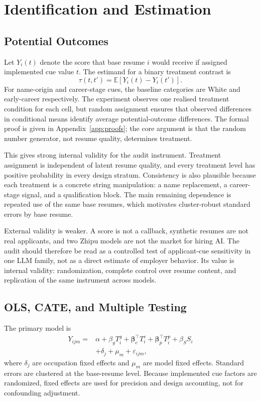 \documentclass[10pt,twocolumn,letterpaper]{article}
\begin{document}
\section{Identification and Estimation}

\subsection{Potential Outcomes}

Let $Y_i(t)$ denote the score that base resume $i$ would receive if assigned implemented cue value $t$. The estimand for a binary treatment contrast is
\[
\tau(t,t') = \mathbb{E}[Y_i(t)-Y_i(t')].
\]
For name-origin and career-stage cues, the baseline categories are White and early-career respectively. The experiment observes one realised treatment condition for each cell, but random assignment ensures that observed differences in conditional means identify average potential-outcome differences. The formal proof is given in Appendix~\ref{app:proofs}; the core argument is that the random number generator, not resume quality, determines treatment.

This gives strong internal validity for the audit instrument. Treatment assignment is independent of latent resume quality, and every treatment level has positive probability in every design stratum. Consistency is also plausible because each treatment is a concrete string manipulation: a name replacement, a career-stage signal, and a qualification block. The main remaining dependence is repeated use of the same base resumes, which motivates cluster-robust standard errors by base resume.

External validity is weaker. A score is not a callback, synthetic resumes are not real applicants, and two Zhipu models are not the market for hiring AI. The audit should therefore be read as a controlled test of applicant-cue sensitivity in one LLM family, not as a direct estimate of employer behavior. Its value is internal validity: randomization, complete control over resume content, and replication of the same instrument across models.

\subsection{OLS, CATE, and Multiple Testing}

The primary model is
\begin{align}
Y_{ijm} ={}& \alpha + \beta_g T^g_i + \bm{\beta}_e^\top T^e_i
 + \bm{\beta}_p^\top T^p_i + \beta_S S_i \nonumber\\
&+ \delta_j + \mu_m + \varepsilon_{ijm},
\end{align}
where $\delta_j$ are occupation fixed effects and $\mu_m$ are model fixed effects. Standard errors are clustered at the base-resume level. Because implemented cue factors are randomized, fixed effects are used for precision and design accounting, not for confounding adjustment.
\end{document}
